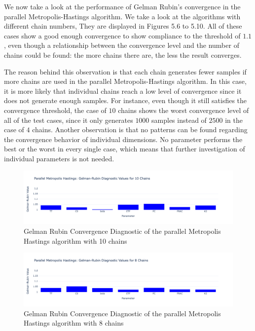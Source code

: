 We now take a look at the performance of Gelman Rubin's convergence in the parallel Metropolis-Hastings algorithm. We take a look at the algorithms with different chain numbers, They are displayed in Figures 5.6 to 5.10. All of these cases show a good enough convergence to show compliance to the threshold of $1.1$, even though a relationship between the convergence level and the number of chains could be found: the more chains there are, the less the result converges.

The reason behind this observation is that each chain generates fewer samples if more chains are used in the parallel Metropolis-Hastings algorithm. In this case, it is more likely that individual chains reach a low level of convergence since it does not generate enough samples. For instance, even though it still satisfies the convergence threshold, the case of $10$ chains shows the worst convergence level of all of the test cases, since it only generates $1000$ samples instead of $2500$ in the case of $4$ chains. Another observation is that no patterns can be found regarding the convergence behavior of individual dimensions. No parameter performs the best or the worst in every single case, which means that further investigation of individual parameters is not needed.

\begin{figure}[H]
    \centering
    \includegraphics[width=1\textwidth]{figures/parallel_mh/GR_10.png}
    \captionsetup{width=.8\textwidth}
    \caption{Gelman Rubin Convergence Diagnostic of the parallel Metropolis Hastings algorithm with 10 chains}
    \label{fig:enter-label}
\end{figure}

\begin{figure}[H]
    \centering
    \includegraphics[width=1\textwidth]{figures/parallel_mh/GR_8.png}
    \captionsetup{width=.8\textwidth}
    \caption{Gelman Rubin Convergence Diagnostic of the parallel Metropolis Hastings algorithm with 8 chains}
    \label{fig:enter-label}
\end{figure}

